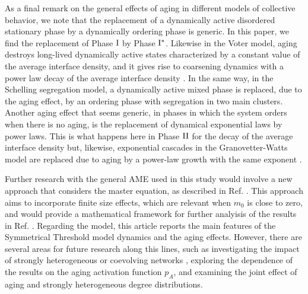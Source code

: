 As a final remark on the general effects of aging in different models of collective behavior, we note that the replacement of a dynamically active disordered stationary phase by a dynamically ordering phase is generic. In this paper, we find the replacement of Phase ${\rm I}$ by Phase ${\rm I}^{*}$. Likewise in the Voter model, aging destroys long-lived dynamically active states characterized by a constant value of the average interface density, and it gives rise to coarsening dynamics with a power law decay of the average interface density \cite{fernandez-gracia-2011}. In the same way, in the Schelling segregation model, a dynamically active mixed phase is replaced, due to the aging effect, by an ordering phase with segregation in two main clusters. 
Another aging effect that seems generic, in phases in which the system orders when there is no aging, is the replacement of dynamical exponential laws by power laws. This is what happens here in  Phase ${\rm II}$ for the decay of the average interface density but, likewise, exponential cascades in the Granovetter-Watts model are replaced due to aging by a power-law growth with the same exponent \cite{Abella-2022-AME}.

Further research with the general AME used in this study would involve a new approach that considers the master equation, as described in Ref. \cite{peralta-2020B}. This approach aims to incorporate finite size effects, which are relevant when $m_0$ is close to zero, and would provide a mathematical framework for further analyisis of the results in Ref. \cite{Konstantin}. Regarding the model, this article reports the main features of the Symmetrical Threshold model dynamics and the aging effects. However, there are several areas for future research along this lines, such as investigating the impact of strongly heterogeneous \cite{barabasi2009scale} or coevolving networks \cite{Zimmermann,vazquez-2008}, exploring the dependence of the results on the aging activation function $p_A$, and examining the joint effect of aging and strongly heterogeneous degree distributions.
